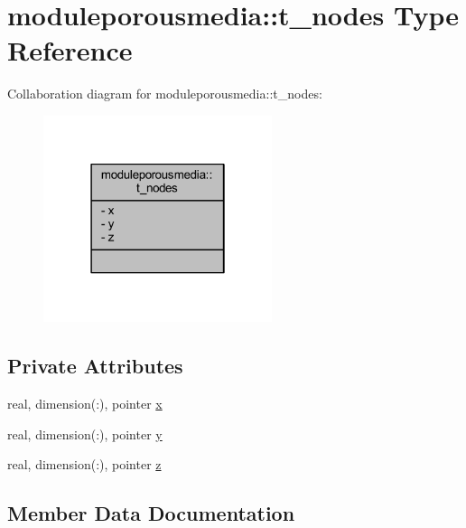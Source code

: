 \hypertarget{structmoduleporousmedia_1_1t__nodes}{}\section{moduleporousmedia\+:\+:t\+\_\+nodes Type Reference}
\label{structmoduleporousmedia_1_1t__nodes}


Collaboration diagram for moduleporousmedia\+:\+:t\+\_\+nodes\+:\nopagebreak
\begin{figure}[H]
\begin{center}
\leavevmode
\includegraphics[width=190pt]{structmoduleporousmedia_1_1t__nodes__coll__graph}
\end{center}
\end{figure}
\subsection*{Private Attributes}
\begin{DoxyCompactItemize}
\item 
real, dimension(\+:), pointer \mbox{\hyperlink{structmoduleporousmedia_1_1t__nodes_aa8b15307588cf61223f8342b6b312063}{x}}
\item 
real, dimension(\+:), pointer \mbox{\hyperlink{structmoduleporousmedia_1_1t__nodes_a34491def5f18f47a3a32027d7aedab60}{y}}
\item 
real, dimension(\+:), pointer \mbox{\hyperlink{structmoduleporousmedia_1_1t__nodes_aa953275f7c441b238baab6e203a34ce5}{z}}
\end{DoxyCompactItemize}


\subsection{Member Data Documentation}
\mbox{\label{structmoduleporousmedia_1_1t__nodes_aa8b15307588cf61223f8342b6b312063}} 
